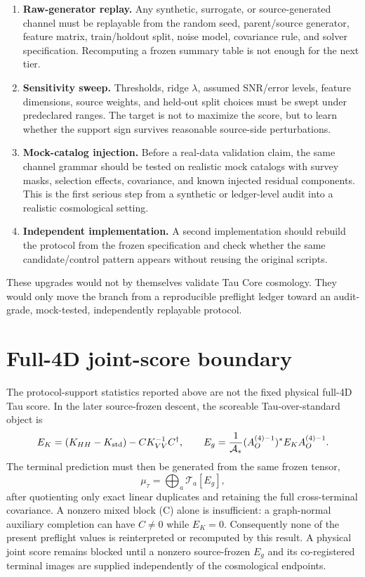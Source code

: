 \documentclass[11pt]{article}
\begin{document}
\begin{enumerate}
\item \textbf{Raw-generator replay.}  Any synthetic, surrogate, or
source-generated channel must be replayable from the random seed, parent/source
generator, feature matrix, train/holdout split, noise model, covariance rule,
and solver specification.  Recomputing a frozen summary table is not enough for
the next tier.
\item \textbf{Sensitivity sweep.}  Thresholds, ridge \(\lambda\), assumed
SNR/error levels, feature dimensions, source weights, and held-out split choices
must be swept under predeclared ranges.  The target is not to maximize the score,
but to learn whether the support sign survives reasonable source-side
perturbations.
\item \textbf{Mock-catalog injection.}  Before a real-data validation claim, the
same channel grammar should be tested on realistic mock catalogs with survey
masks, selection effects, covariance, and known injected residual components.
This is the first serious step from a synthetic or ledger-level audit into a
realistic cosmological setting.
\item \textbf{Independent implementation.}  A second implementation should
rebuild the protocol from the frozen specification and check whether the same
candidate/control pattern appears without reusing the original scripts.
\end{enumerate}

These upgrades would not by themselves validate Tau Core cosmology.  They would
only move the branch from a reproducible preflight ledger toward an
audit-grade, mock-tested, independently replayable protocol.

\section{Full-4D joint-score boundary}

The protocol-support statistics reported above are not the fixed physical
full-4D Tau score.  In the later source-frozen descent, the scoreable
Tau-over-standard object is
\[
 E_K=(K_{HH}-K_{\rm std})-C K_{VV}^{-1}C^\dagger,
 \qquad
 E_g=\frac{1}{\mathcal A_*}(A_O^{(4)-1})^*E_KA_O^{(4)-1}.
\]
The terminal prediction must then be generated from the same frozen tensor,
\[
 \mu_\tau=\bigoplus_a \mathcal T_a[E_g],
\]
after quotienting only exact linear duplicates and retaining the full
cross-terminal covariance.  A nonzero mixed block (C) alone is insufficient:
a graph-normal auxiliary completion can have $C\neq0$ while $E_K=0$.
Consequently none of the present preflight values is reinterpreted or
recomputed by this result.  A physical joint score remains blocked until a
nonzero source-frozen $E_g$ and its co-registered terminal images are supplied
independently of the cosmological endpoints.
\end{document}
